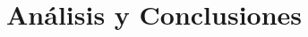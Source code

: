 \documentclass[12pt,letterpaper,hidelinks]{extarticle}
\begin{document}
\section{Análisis y Conclusiones}


%
%
%

%


\end{document}
